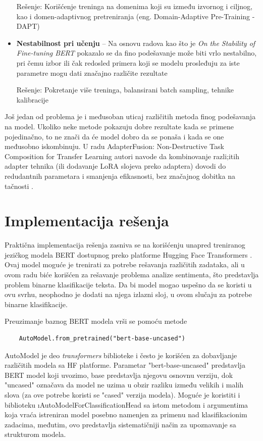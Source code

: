 \documentclass[12pt,oneside]{memoir}
\begin{document}
\begin{itemize}
	Rešenje: Korišćenje treninga na domenima koji su između izvornog i ciljnog, kao i domen-adaptivnog pretreniranja (eng. Domain-Adaptive Pre-Training - DAPT) \cite{ding2023diagnosing}
	
	\item \textbf{Nestabilnost pri učenju} – Na osnovu radova kao što je \textit{On the Stability of Fine-tuning BERT} pokazalo se da fino podešavanje može biti vrlo nestabilno, pri čemu izbor ili čak redosled primera koji se modelu prosleđuju za iste parametre mogu dati značajno različite rezultate
	
	Rešenje: Pokretanje više treninga, balansirani batch sampling, tehnike kalibracije \cite{2025calibration}
	
\end{itemize}


Još jedan od problema je i međusoban uticaj različitih metoda finog podešavanja na model. Ukoliko neke metode pokazuju dobre rezultate kada se primene pojedinačno, to ne znači da će model dobro da se ponaša i kada se one međusobno iskombinuju. U radu AdapterFusion: Non-Destructive Task Composition for Transfer Learning autori navode da kombinovanje razli;itih adapter tehnika (ili dodavanje LoRA slojeva preko adaptera) dovodi do redudantnih parametara i smanjenja efikasnosti, bez značajnog dobitka na tačnosti \cite{pfeiffer2021adapternondestructive}.


\chapter{Implementacija rešenja}
Praktična implementacija rešenja zasniva se na korišćenju unapred treniranog jezičkog modela BERT dostupnog preko platforme Hugging Face Transformers \cite{Huggingface2023}. Ovaj model moguće je trenirati za potrebe rešavanja različitih zadataka, ali u ovom radu biće korišćen za rešavanje problema analize sentimenta, što predstavlja problem binarne klasifikacije teksta. Da bi model mogao uspešno da se koristi u ovu svrhu, neophodno je dodati na njega izlazni sloj, u ovom slučaju za potrebe binarne klasifikacije.

Preuzimanje baznog BERT modela vrši se pomoću metode \begin{verbatim}
	AutoModel.from_pretrained("bert-base-uncased")
\end{verbatim}
AutoModel je deo \textit{transformers} biblioteke i često je korišćen za dobavljanje različitih modela sa HF platforme. Parametar "bert-base-uncased" predstavlja BERT model koji uvozimo, base predstavlja njegovu osnovnu verziju, dok "uncased" označava da model ne uzima u obzir razliku između velikih i malih slova (za ove potrebe koristi se "cased" verzija modela). Moguće je koristiti i biblioteku \i{AutoModelForClassificationHead} sa istom metodom i argumentima koja vraća istreniran model posebno namenjen za primenu nad klasifikacionim zadacima, međutim, ovo predstavlja sistematičniji način za upoznavanje sa strukturom modela.
\end{document}
